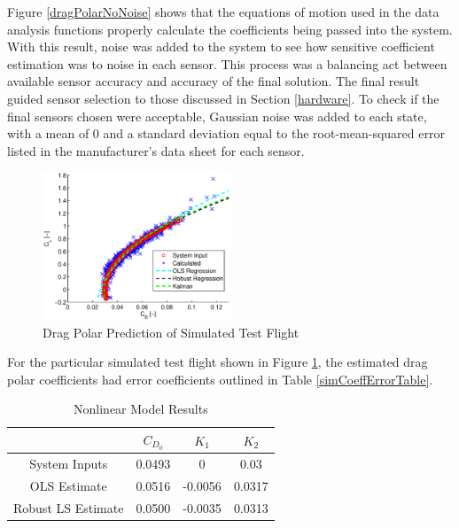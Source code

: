 \documentclass[12pt]{ucthesis}
\begin{document}
Figure \ref{dragPolarNoNoise} shows that the equations of motion used in the data analysis functions properly calculate the coefficients being passed into the system. With this result, noise was added to the system to see how sensitive coefficient estimation was to noise in each sensor. This process was a balancing act between available sensor accuracy and accuracy of the final solution. The final result guided sensor selection to those discussed in Section \ref{hardware}. To check if the final sensors chosen were acceptable, Gaussian noise was added to each state, with a mean of $0$ and a standard deviation equal to the root-mean-squared error listed in the manufacturer's data sheet for each sensor.
\begin{figure}[H]
  \caption{Drag Polar Prediction of Simulated Test Flight} \label{dragPolarNoise}
  \centering
    \includegraphics[width=0.5\textwidth]{figures/simDragPolarNoise.eps}
\end{figure}

For the particular simulated test flight shown in Figure \ref{dragPolarNoise}, the estimated drag polar coefficients had error coefficients outlined in Table \ref{simCoeffErrorTable}.

\begin{table}[ht]
\caption{Nonlinear Model Results} %
\centering %
\begin{tabular}{c c c c} %
\hline\hline %
 & $C_{D_0}$ & $K_1$ & $K_2$ \\ [0.5ex] %
\hline %
System Inputs & 0.0493 & 0 & 0.03 \\ %
OLS Estimate & 0.0516 & -0.0056 & 0.0317 \\
Robust LS Estimate & 0.0500 & -0.0035 & 0.0313 \\ [1ex] %
\hline %
\end{tabular}
\label{table:nonlin} %
\end{table}
\end{document}
